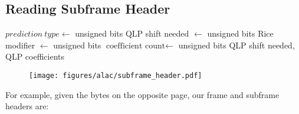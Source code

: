 \subsection{Reading Subframe Header}
$prediction~type \leftarrow$  unsigned bits
QLP shift needed $\leftarrow$  unsigned bits\;
Rice modifier $\leftarrow$  unsigned bits
$\text{coefficient count} \leftarrow$  unsigned bits
\Return QLP shift needed, QLP coefficients
\EALGORITHM
\begin{figure}[h]
\texttt{[image: figures/alac/subframe\_header.pdf]}
\end{figure}
\par
\noindent
For example, given the bytes on the opposite page,
our frame and subframe headers are:
